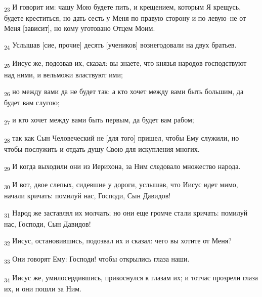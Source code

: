 \begin{tcolorbox}
\textsubscript{23} И говорит им: чашу Мою будете пить, и крещением, которым Я крещусь, будете креститься, но дать сесть у Меня по правую сторону и по левую--не от Меня [зависит], но кому уготовано Отцем Моим.
\end{tcolorbox}
\begin{tcolorbox}
\textsubscript{24} Услышав [сие, прочие] десять [учеников] вознегодовали на двух братьев.
\end{tcolorbox}
\begin{tcolorbox}
\textsubscript{25} Иисус же, подозвав их, сказал: вы знаете, что князья народов господствуют над ними, и вельможи властвуют ими;
\end{tcolorbox}
\begin{tcolorbox}
\textsubscript{26} но между вами да не будет так: а кто хочет между вами быть большим, да будет вам слугою;
\end{tcolorbox}
\begin{tcolorbox}
\textsubscript{27} и кто хочет между вами быть первым, да будет вам рабом;
\end{tcolorbox}
\begin{tcolorbox}
\textsubscript{28} так как Сын Человеческий не [для того] пришел, чтобы Ему служили, но чтобы послужить и отдать душу Свою для искупления многих.
\end{tcolorbox}
\begin{tcolorbox}
\textsubscript{29} И когда выходили они из Иерихона, за Ним следовало множество народа.
\end{tcolorbox}
\begin{tcolorbox}
\textsubscript{30} И вот, двое слепых, сидевшие у дороги, услышав, что Иисус идет мимо, начали кричать: помилуй нас, Господи, Сын Давидов!
\end{tcolorbox}
\begin{tcolorbox}
\textsubscript{31} Народ же заставлял их молчать; но они еще громче стали кричать: помилуй нас, Господи, Сын Давидов!
\end{tcolorbox}
\begin{tcolorbox}
\textsubscript{32} Иисус, остановившись, подозвал их и сказал: чего вы хотите от Меня?
\end{tcolorbox}
\begin{tcolorbox}
\textsubscript{33} Они говорят Ему: Господи! чтобы открылись глаза наши.
\end{tcolorbox}
\begin{tcolorbox}
\textsubscript{34} Иисус же, умилосердившись, прикоснулся к глазам их; и тотчас прозрели глаза их, и они пошли за Ним.
\end{tcolorbox}
